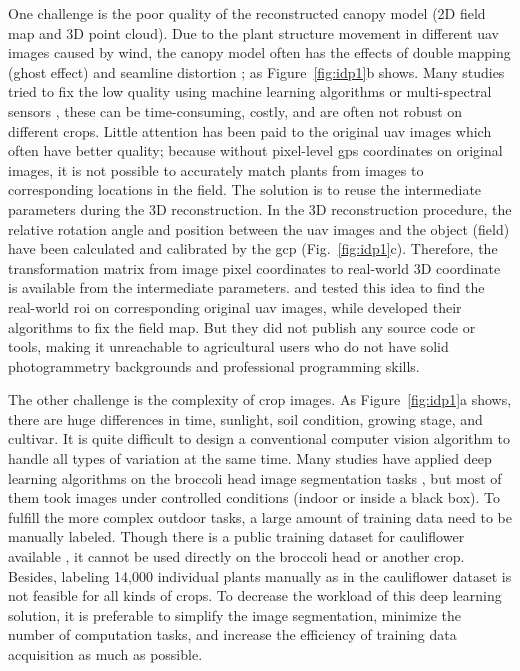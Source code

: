 One challenge is the poor quality of the reconstructed canopy model (2D field map and 3D point cloud). Due to the plant structure movement in different \gls{uav} images caused by wind, the canopy model often has the effects of double mapping (ghost effect) and seamline distortion \citep{lin_new_2021}; as Figure~\ref{fig:idp1}b shows. Many studies tried to fix the low quality using machine learning algorithms \citep{hu_pixel_2019,hu_coupling_2021,velumani_estimates_2021} or multi-spectral sensors \citep{guo_wheat_2021,lu_assessment_2022}, these can be time-consuming, costly, and are often not robust on different crops. Little attention has been paid to the original \gls{uav} images which often have better quality; because without pixel-level \gls{gps} coordinates on original images, it is not possible to accurately match plants from images to corresponding locations in the field. The solution is to reuse the intermediate parameters during the 3D reconstruction. In the 3D reconstruction procedure, the relative rotation angle and position between the \gls{uav} images and the object (field) have been calculated and calibrated by the \gls{gcp} (Fig.~\ref{fig:idp1}c). Therefore, the transformation matrix from image pixel coordinates to real-world 3D coordinate is available from the intermediate parameters. \citet{duan_comparison_2017} and \citet{guo_aerial_2018} tested this idea to find the real-world \gls{roi} on corresponding original \gls{uav} images, while \citet{lin_new_2021} developed their algorithms to fix the field map. But they did not publish any source code or tools, making it unreachable to agricultural users who do not have solid photogrammetry backgrounds and professional programming skills.



The other challenge is the complexity of crop images. As Figure~\ref{fig:idp1}a shows, there are huge differences in  time, sunlight, soil condition, growing stage, and cultivar. It is quite difficult to design a conventional computer vision algorithm to handle all types of variation at the same time. Many studies have applied deep learning algorithms on the broccoli head image segmentation tasks \citep{garcia_towards_2021,blok_image_2021,zhou_monitoring_2020}, but most of them took images under controlled conditions (indoor or inside a black box). To fulfill the more complex outdoor tasks, a large amount of training data need to be manually labeled. Though there is a public training dataset for cauliflower available \citep{kierdorf_growliflower_2022}, it cannot be used directly on the broccoli head or another crop. Besides, labeling 14,000 individual plants manually as in the cauliflower dataset is not feasible for all kinds of crops. To decrease the workload of this deep learning solution, it is preferable to simplify the image segmentation, minimize the number of computation tasks, and increase the efficiency of training data acquisition as much as possible.

